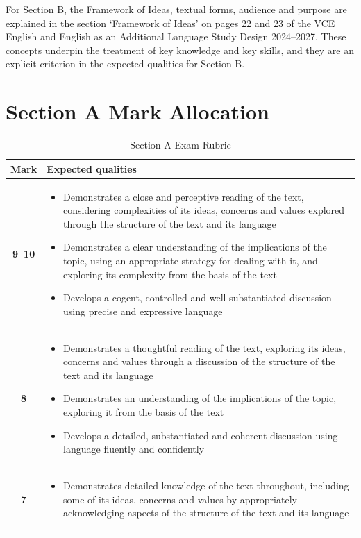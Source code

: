 \documentclass[a4paper]{article}
\begin{document}
For Section B, the Framework of Ideas, textual forms, audience and purpose are explained in the section ‘Framework of Ideas’ on pages 22 and 23 of the VCE English and English as an Additional Language Study Design 2024–2027. These concepts underpin the treatment of key knowledge and key skills, and they are an explicit criterion in the expected qualities for Section B.\\

\newpage

\section{Section A Mark Allocation}

\begin{longtable}{|c|p{13cm}|}
\caption{Section A Exam Rubric} \label{tab:sectiona}\\
\hline
\textbf{Mark} & \textbf{Expected qualities} \\
\hline
\textbf{9--10} & 
\begin{itemize}
  \item Demonstrates a close and perceptive reading of the text, considering complexities of its ideas, concerns and values explored through the structure of the text and its language
  \item Demonstrates a clear understanding of the implications of the topic, using an appropriate strategy for dealing with it, and exploring its complexity from the basis of the text
  \item Develops a cogent, controlled and well-substantiated discussion using precise and expressive language
\end{itemize} \\
\hline
\textbf{8} & 
\begin{itemize}
  \item Demonstrates a thoughtful reading of the text, exploring its ideas, concerns and values through a discussion of the structure of the text and its language 
  \item Demonstrates an understanding of the implications of the topic, exploring it from the basis of the text
  \item Develops a detailed, substantiated and coherent discussion using language fluently and confidently
\end{itemize} \\
\hline
\textbf{7} & 
\begin{itemize}
  \item Demonstrates detailed knowledge of the text throughout, including some of its ideas, concerns and values by appropriately acknowledging aspects of the structure of the text and its language 

\end{itemize}
\end{longtable}
\end{document}
